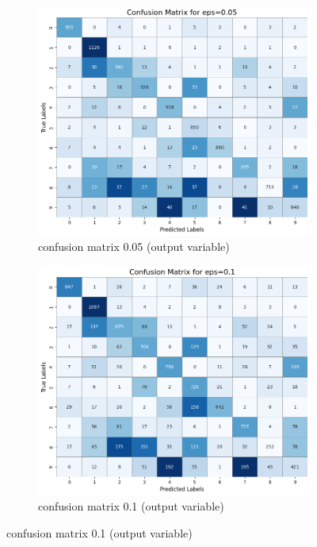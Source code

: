 \documentclass[11pt,onside]{article}
\begin{document}
\begin{figure}[h]
  \centering
  \begin{subfigure}[b]{0.49\textwidth}
    \centering
    \includegraphics[width=\textwidth]{V2_images/_correct_labels_confusion_matrix_eps_0.05.png}
    \caption{confusion matrix 0.05 (output variable)}
    \label{fig:image1}
  \end{subfigure}
  \hfill
  \begin{subfigure}[b]{0.49\textwidth}
    \centering
    \includegraphics[width=\textwidth]{V2_images/_correct_labels_confusion_matrix_eps_0.1.png}
    \caption{confusion matrix 0.1 (output variable)}
    \label{fig:image2}
  \end{subfigure}

  \label{fig:images}
\end{figure}
\end{document}
